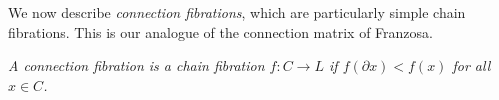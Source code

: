 

We now describe {\em connection fibrations}, which are particularly simple chain fibrations. This is our analogue of the connection matrix of Franzosa.

\begin{defn}\label{def:connection}
{\em
A {\em connection fibration} is a chain fibration $f:C\to L$ if $f(\partial x) < f(x)$ for all $x\in C$.
}
\end{defn}


%
%
%





 

